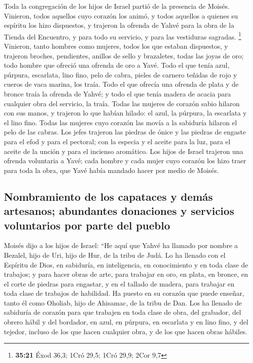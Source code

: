  Toda la congregación de los hijos de Israel partió de la
presencia de Moisés.  Vinieron, todos aquellos cuyo
corazón los animó, y todos aquellos a quienes su espíritu los hizo
dispuestos, y trajeron la ofrenda de Yahvé para la obra de la Tienda del
Encuentro, y para todo su servicio, y para las vestiduras sagradas.
\footnote{\textbf{35:21} Éxod 36,3; 1Cró 29,5; 1Cró 29,9; 2Cor 9,7}
 Vinieron, tanto hombres como mujeres, todos los que
estaban dispuestos, y trajeron broches, pendientes, anillos de sello y
brazaletes, todas las joyas de oro; todo hombre que ofreció una ofrenda
de oro a Yavé.  Todo el que tenía azul, púrpura,
escarlata, lino fino, pelo de cabra, pieles de carnero teñidas de rojo y
cueros de vaca marina, los traía.  Todo el que ofrecía
una ofrenda de plata y de bronce traía la ofrenda de Yahvé; y todo el
que tenía madera de acacia para cualquier obra del servicio, la traía.
 Todas las mujeres de corazón sabio hilaron con sus
manos, y trajeron lo que habían hilado: el azul, la púrpura, la
escarlata y el lino fino.  Todas las mujeres cuyo corazón
las movía a la sabiduría hilaron el pelo de las cabras. 
Los jefes trajeron las piedras de ónice y las piedras de engaste para el
efod y para el pectoral;  con la especia y el aceite para
la luz, para el aceite de la unción y para el incienso aromático.
 Los hijos de Israel trajeron una ofrenda voluntaria a
Yavé; cada hombre y cada mujer cuyo corazón los hizo traer para toda la
obra, que Yavé había mandado hacer por medio de Moisés.

\hypertarget{nombramiento-de-los-capataces-y-demuxe1s-artesanos-abundantes-donaciones-y-servicios-voluntarios-por-parte-del-pueblo}{%
\subsection{Nombramiento de los capataces y demás artesanos; abundantes
donaciones y servicios voluntarios por parte del
pueblo}\label{nombramiento-de-los-capataces-y-demuxe1s-artesanos-abundantes-donaciones-y-servicios-voluntarios-por-parte-del-pueblo}}

 Moisés dijo a los hijos de Israel: ``He aquí que Yahvé
ha llamado por nombre a Bezalel, hijo de Uri, hijo de Hur, de la tribu
de Judá.  Lo ha llenado con el Espíritu de Dios, en
sabiduría, en inteligencia, en conocimiento y en toda clase de trabajos;
 y para hacer obras de arte, para trabajar en oro, en
plata, en bronce,  en el corte de piedras para engastar,
y en el tallado de madera, para trabajar en toda clase de trabajos de
habilidad.  Ha puesto en su corazón que puede enseñar,
tanto él como Oholiab, hijo de Ahisamac, de la tribu de Dan.
 Los ha llenado de sabiduría de corazón para que trabajen
en toda clase de obra, del grabador, del obrero hábil y del bordador, en
azul, en púrpura, en escarlata y en lino fino, y del tejedor, incluso de
los que hacen cualquier obra, y de los que hacen obras hábiles.


